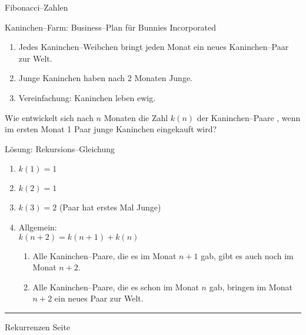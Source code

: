 
\begin{slide}{}
\normalsize

\begin{center}
Fibonacci--Zahlen
\end{center}
\vspace*{0.5cm}

\footnotesize
Kaninchen--Farm: Business--Plan f\"ur Bunnies Incorporated
\begin{enumerate}
\item Jedes Kaninchen--Weibchen bringt jeden Monat ein
      neues Kaninchen--Paar  zur Welt.
\item Junge Kaninchen haben nach 2 Monaten Junge.
\item Vereinfachung: Kaninchen leben ewig. 
\end{enumerate}
Wie entwickelt sich nach $n$ Monaten die Zahl $k(n)$ der Kaninchen--Paare , wenn im ersten Monat
1 Paar junge Kaninchen eingekauft wird?

L\"osung: Rekursions--Gleichung
\begin{enumerate}
\item $k(1) = 1$
\item $k(2) = 1$
\item $k(3) = 2$ (Paar hat erstes Mal Junge)
\item Allgemein: \\[0.3cm]
      \hspace*{1.3cm} $k(n+2) = k(n + 1) + k(n)$ 
      \begin{enumerate}
      \item Alle Kaninchen--Paare, die es im Monat $n + 1$ gab, gibt es auch noch
            im Monat $n + 2$.
      \item Alle Kaninchen--Paare, die es schon im Monat $n$ gab, bringen im Monat
            $n + 2$ ein neues Paar zur Welt.
      \end{enumerate}
\end{enumerate}
\vspace*{\fill}
\tiny \addtocounter{mypage}{1}
\rule{17cm}{1mm}
Rekurrenzen  \hspace*{\fill} Seite 
\end{slide}


